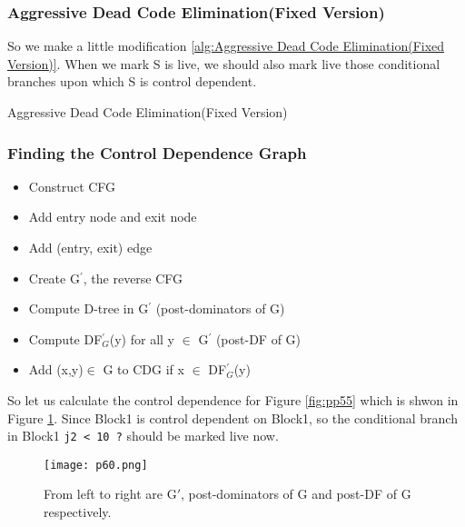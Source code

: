 \subsubsection{Aggressive Dead Code Elimination(Fixed Version)}

So we make a little modification \ref{alg:Aggressive Dead Code Elimination(Fixed Version)}. When we mark S is live, we should also mark live those conditional branches upon which S is
control dependent.

\begin{algorithm}[H]
	\caption{Aggressive Dead Code Elimination(Fixed Version)}\label{alg:Aggressive Dead Code Elimination(Fixed Version)}
	\begin{algorithmic}
		\EndIf
		\EndWhile
		\EndFunction
	\end{algorithmic}
\end{algorithm}



\subsubsection{Finding the Control Dependence Graph}

\begin{itemize}
	\item Construct CFG
	\item Add entry node and exit node
	\item Add (entry, exit) edge
	\item Create G$^\prime$, the reverse CFG
	\item Compute D-tree in G$^\prime$ (post-dominators of G)
	\item Compute DF$_G^\prime$(y) for all y $\in$ G$^\prime$ (post-DF of G)
	\item Add (x,y)$\in$ G to CDG if x $\in$ DF$_G^\prime$(y)
\end{itemize}



So let us calculate the control dependence for Figure \ref{fig:pp55} which is shwon in Figure \ref{fig:p60}. Since Block1 is control dependent on Block1, so the conditional
branch in Block1 \texttt{j2 < 10 ?} should be marked live now.

\begin{figure}[H]
	\centering
	\texttt{[image: p60.png]}
	\caption{From left to right are G$\prime$, post-dominators of G and post-DF of G respectively.}
	\label{fig:p60}
\end{figure}



